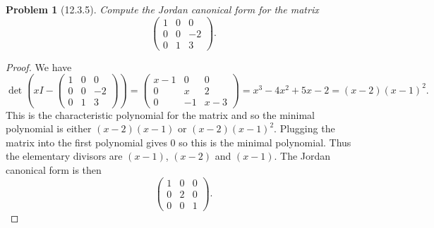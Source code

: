 \documentclass{article}
\newtheorem{problem}{Problem}
\begin{document}
\begin{problem}[12.3.5]
Compute the Jordan canonical form for the matrix
\[
\left (
\begin{array}{ccc}
1 & 0 & 0\\
0 & 0 & -2\\
0 & 1 & 3
\end{array}
\right).
\]
\end{problem}
\begin{proof}
We have
\[
\det \left (xI -
\left (
\begin{array}{ccc}
1 & 0 & 0\\
0 & 0 & -2\\
0 & 1 & 3
\end{array}
\right) \right )
=
\left (
\begin{array}{ccc}
x-1 & 0 & 0\\
0 & x & 2\\
0 & -1 & x-3
\end{array}
\right)
=
x^3-4x^2+5x-2 = (x-2)(x-1)^2.
\]
This is the characteristic polynomial for the matrix and so the minimal polynomial is either $(x-2)(x-1)$ or $(x-2)(x-1)^2$. Plugging the matrix into the first polynomial gives $0$ so this is the minimal polynomial. Thus the elementary divisors are $(x-1)$, $(x-2)$ and $(x-1)$. The Jordan canonical form is then
\[
\left (
\begin{array}{ccc}
1 & 0 & 0 \\
0 & 2 & 0 \\
0 & 0 & 1
\end{array}
\right ).
\]
\end{proof}
\end{document}
